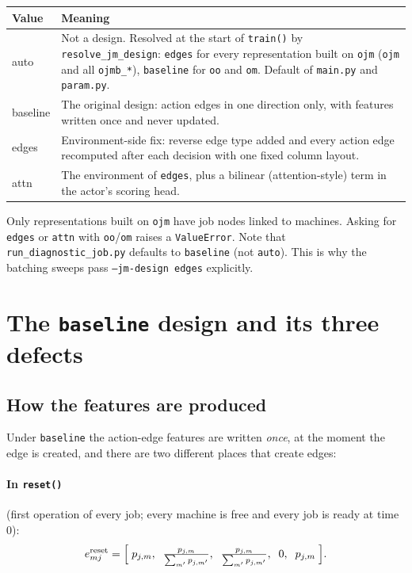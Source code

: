 \documentclass[11pt,a4paper]{article}
\newcommand{\code}[1]{\texttt{#1}}
\theoremstyle{remark}
\begin{document}
\begin{center}
\begin{tabular}{>{\ttfamily}l p{11.5cm}}
\toprule
\normalfont\textbf{Value} & \textbf{Meaning} \\
\midrule
auto     & Not a design. Resolved at the start of \code{train()} by
           \code{resolve\_jm\_design}: \code{edges} for every representation built
           on \code{ojm} (\code{ojm} and all \code{ojmb\_*}), \code{baseline} for
           \code{oo} and \code{om}. Default of \code{main.py} and \code{param.py}. \\
baseline & The original design: action edges in one direction only, with features
           written once and never updated. \\
edges    & Environment-side fix: reverse edge type added and every action edge
           recomputed after each decision with one fixed column layout. \\
attn     & The environment of \code{edges}, plus a bilinear (attention-style)
           term in the actor's scoring head. \\
\bottomrule
\end{tabular}
\end{center}

Only representations built on \code{ojm} have job nodes linked to machines. Asking for
\code{edges} or \code{attn} with \code{oo}/\code{om} raises a \code{ValueError}.
Note that \code{run\_diagnostic\_job.py} defaults to \code{baseline} (not \code{auto}).
This is why the batching sweeps pass \code{--jm-design edges} explicitly.

\section{The \texttt{baseline} design and its three defects}
\label{sec:baseline}

\subsection{How the features are produced}
Under \code{baseline} the action-edge features are written \emph{once}, at the moment the edge
is created, and there are two different places that create edges:

\paragraph{In \code{reset()}} (first operation of every job; every machine is free and
every job is ready at time $0$):
\[
  e^{\mathrm{reset}}_{mj} =
  \Bigl[\; p_{j,m},\;\; \tfrac{p_{j,m}}{\sum_{m'} p_{j,m'}},\;\;
        \tfrac{p_{j,m}}{\sum_{m'} p_{j,m'}},\;\; 0,\;\; p_{j,m} \;\Bigr].
\]
\end{document}
